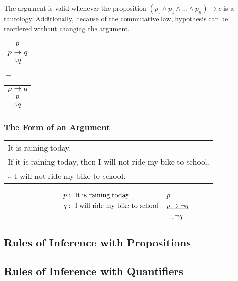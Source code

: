 \documentclass{article}
\begin{document}
The argument is valid whenever the proposition \((p_1 \land p_1 \land \dots \land p_n) \rightarrow c\) is a tautology.
Additionally, because of the commutative law, hypothesis can be reordered without changing the argument.
\begin{center}
  \begin{tabular}{c}
    \(p\)               \\
    \(p \rightarrow q\) \\
    \hline
    \(\therefore q\)
  \end{tabular}
  \quad
  \(\equiv\)
  \quad
  \begin{tabular}{c}
    \(p \rightarrow q\) \\
    \(p\)               \\
    \hline
    \(\therefore q\)
  \end{tabular}
\end{center}

\subsubsection{The Form of an Argument}

\begin{center}
  \begin{tabular}{l}
    It is raining today.                                            \\
    If it is raining today, then I will not ride my bike to school. \\
    \hline
    \(\therefore\) I will not ride my bike to school.
  \end{tabular}

  \begin{align*}
    p & : \text{ It is raining today.}           &  & p                                    \\
    q & : \text{ I will ride my bike to school.} &  & \underbar{\(p \rightarrow \lnot q\)} \\
      &                                          &  & \therefore \lnot q
  \end{align*}

\end{center}

\subsection{Rules of Inference with Propositions}



\subsection{Rules of Inference with Quantifiers}
\end{document}
